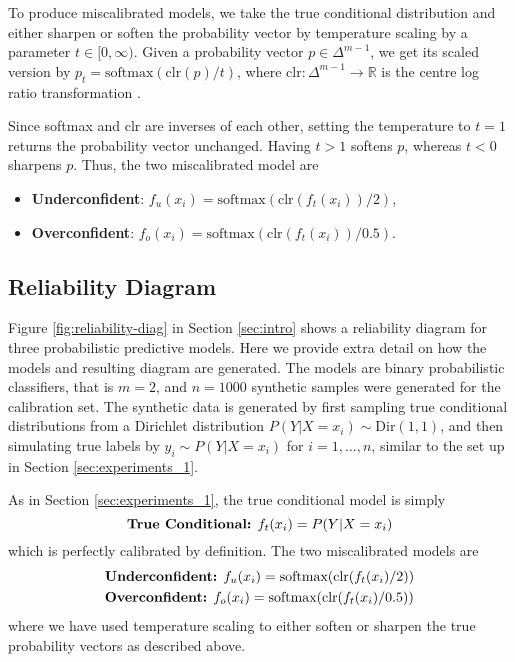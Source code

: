 \documentclass[twocolumn]{article}
\theoremstyle{definition}
\begin{document}
To produce miscalibrated models, we take the true conditional distribution and either sharpen or soften the probability vector by temperature scaling by a parameter $t \in [0, \infty)$. Given a probability vector $p \in \Delta^{m-1}$, we get its scaled version by $p_t = \text{softmax}(\text{clr}(p)/t)$, where $\text{clr}: \Delta^{m-1} \to \mathbb{R}$ is the centre log ratio transformation \citep{Aitchison_1982}.

Since softmax and clr are inverses of each other, setting the temperature to $t=1$ returns the probability vector unchanged. Having $t>1$ softens $p$, whereas $t<0$ sharpens $p$. Thus, the two miscalibrated model are
\begin{itemize}
    \item \textbf{Underconfident}: $f_u(x_i) = \text{softmax}(\text{clr}(f_t(x_i))/2)$,
    
    \item \textbf{Overconfident}: $f_o(x_i) = \text{softmax}(\text{clr}(f_t(x_i))/0.5)$.
\end{itemize} 

\subsection{Reliability Diagram} \label{Ap:rel_dia}

Figure \ref{fig:reliability-diag} in Section \ref{sec:intro} shows a reliability diagram for three probabilistic predictive models. Here we provide extra detail on how the models and resulting diagram are generated. The models are binary probabilistic classifiers, that is $m=2$, and $n=1000$ synthetic samples were generated for the calibration set. The synthetic data is generated by first sampling true conditional distributions from a Dirichlet distribution $P(Y|X=x_i) \sim \text{Dir}(1,1)$, and then simulating true labels by $y_i \sim P(Y|X=x_i)$ for $i=1,\dots,n$, similar to the set up in Section \ref{sec:experiments_1}. 

As in Section \ref{sec:experiments_1}, the true conditional model is simply
\begin{equation*}
    \text{\textbf{True Conditional:} } f_t(x_i) = P(Y|X=x_i)
\end{equation*}
which is perfectly calibrated by definition. The two miscalibrated models are
\begin{align*}
    &\text{\textbf{Underconfident:} } f_u(x_i) = \text{softmax}(\text{clr}(f_t(x_i)/2)) \\
    &\text{\textbf{Overconfident:} } f_o(x_i) = \text{softmax}(\text{clr}(f_t(x_i)/0.5))
\end{align*}
where we have used temperature scaling to either soften or sharpen the true probability vectors as described above. 
\end{document}
